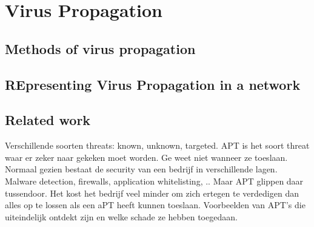 \chapter{Virus Propagation }
\label{chapter4: Virus propagation}
%
%
%
%
%
%
%
\section{Methods of virus propagation}
\section{REpresenting Virus Propagation in a network}
\section{Related work}
Verschillende soorten threats: known, unknown, targeted.
APT is het soort threat waar er zeker naar gekeken moet worden. Ge weet niet wanneer ze toeslaan. Normaal gezien bestaat de security van een bedrijf in verschillende lagen. Malware detection, firewalls, application whitelisting, .. Maar APT glippen daar tussendoor. Het kost het bedrijf veel minder om zich ertegen te verdedigen dan alles op te lossen als een aPT heeft kunnen toeslaan. 
Voorbeelden van APT's die uiteindelijk ontdekt zijn en welke schade ze hebben toegedaan. 


